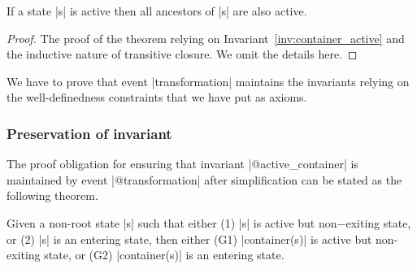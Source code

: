 \begin{theorem}
\label{thm:@ancestor_active}
If a state |s| is active then all ancestors of |s| are also active.
\begin{center}
\end{center}
\end{theorem}
\begin{proof}
The proof of the theorem relying on Invariant~\ref{inv:container_active} and the inductive nature of transitive closure. We omit the details here.
\end{proof}

We have to prove that event |transformation| maintains the  invariants relying on the well-definedness constraints that we have put as axioms.


\subsubsection{Preservation of invariant }
The proof obligation for ensuring that invariant |@active_container| is maintained by event |@transformation| after simplification can be stated as the following theorem.
\begin{theorem}
\label{po:transformation/active_container/INV}
Given a non-root state |s| such that either (1) |s| is active but non−exiting state, or (2) |s| is an entering state, then either (G1) |container(s)| is active but non-exiting state, or (G2) |container(s)| is an entering state.
\end{theorem}

